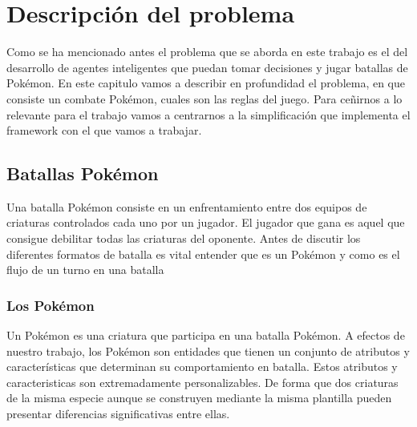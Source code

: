 \chapter{Descripción del problema}

Como se ha mencionado antes el problema que se aborda en este trabajo es el del desarrollo de agentes inteligentes que puedan tomar decisiones y jugar batallas de Pokémon. En este capitulo vamos a describir en profundidad el problema, en que consiste un combate Pokémon, cuales son las reglas del juego. Para ceñirnos a lo relevante para el trabajo vamos a centrarnos a la simplificación que implementa el framework con el que vamos a trabajar.

\section{Batallas Pokémon}

Una batalla Pokémon consiste en un enfrentamiento entre dos equipos de criaturas controlados cada uno por un jugador. El jugador que gana es aquel que consigue debilitar todas las criaturas del oponente. Antes de discutir los diferentes formatos de batalla es vital entender que es un Pokémon y como es el flujo de un turno en una batalla
\subsection{Los Pokémon}
Un Pokémon es una criatura que participa en una batalla Pokémon. A efectos de nuestro trabajo, los Pokémon son entidades que tienen un conjunto de atributos y características que determinan su comportamiento en batalla. Estos atributos y caracteristicas son extremadamente personalizables. De forma que dos criaturas de la misma especie aunque se construyen mediante la misma plantilla pueden presentar diferencias significativas entre ellas.

